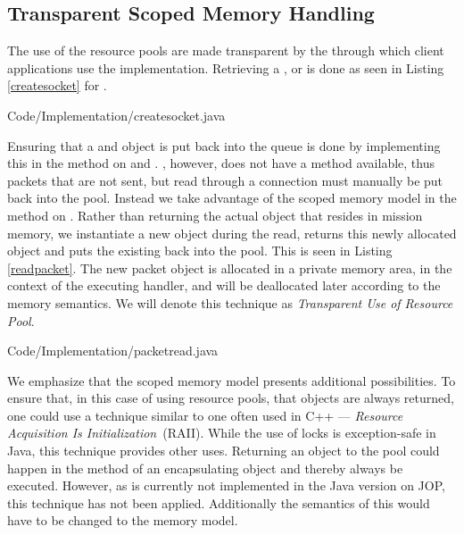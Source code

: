 \subsection{Transparent Scoped Memory Handling} %
\label{sub:transparent_memory_}
The use of the resource pools are made transparent by the  through which client applications use the implementation. Retrieving a ,  or  is done as seen in Listing \ref{createsocket} for .

{Code/Implementation/createsocket.java}

Ensuring that a  and  object is put back into the queue is done by implementing this in the  method on  and . , however, does not have a  method available, thus packets that are not sent, but read through a connection must manually be put back into the pool. Instead we take advantage of the scoped memory model in the  method on . Rather than returning the actual  object that resides in mission memory, we instantiate a new object during the read, returns this newly allocated  object and puts the existing back into the pool. This is seen in Listing \ref{readpacket}. The new packet object is allocated in a private memory area, in the context of the executing handler, and will be deallocated later according to the memory semantics. We will denote this technique as \textit{Transparent Use of Resource Pool}.

{Code/Implementation/packetread.java}


We emphasize that the scoped memory model presents additional possibilities. To ensure that, in this case of using resource pools, that objects are always returned, one could use a technique similar to one often used in C++ --- \textit{Resource Acquisition Is Initialization}~(RAII)\cite{RAII}. While the use of locks is exception-safe in Java, this technique provides other uses. Returning an object to the pool could happen in the  method of an encapsulating object and thereby always be executed. However, as  is currently not implemented in the Java version on JOP, this technique has not been applied. Additionally the semantics of this would have to be changed to the memory model.